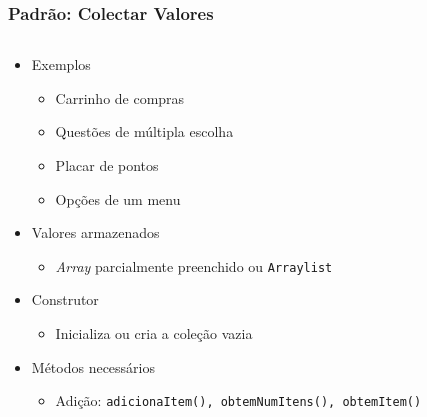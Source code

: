\documentclass[xcolor={dvipsnames,table},aspectratio=169]{beamer}
\begin{document}
\begin{frame}[fragile]\frametitle{Padrão: Colectar Valores}
\begin{columns}[T]
	\begin{column}{0.5\linewidth}
\begin{itemize}
	\item Exemplos
	\begin{itemize}
		\item Carrinho de compras
		\item Questões de múltipla escolha
		\item Placar de pontos
		\item Opções de um menu
	\end{itemize}
	\item Valores armazenados
	\begin{itemize}
		\item \emph{Array} parcialmente preenchido ou \texttt{Arraylist}
	\end{itemize}
	\item Construtor
	\begin{itemize}
		\item Inicializa ou cria a coleção vazia
	\end{itemize}
	\item Métodos necessários
	\begin{itemize}
		\item Adição: \texttt{adicionaItem(), \texttt{obtemNumItens()}, \texttt{obtemItem()}}
	\end{itemize}
\end{itemize}
	\end{column}
	\begin{column}{0.5\linewidth}
{\tiny\inputminted[bgcolor=cyan!10]{java}{src/CarrinhoDeCompras.java}}
	\end{column}
\end{columns}
\end{frame}
\end{document}
